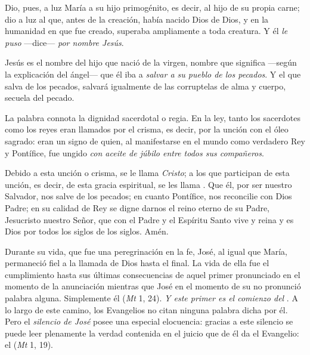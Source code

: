 \begin{body}
				Dio, pues, a luz María a su hijo primogénito, es decir, al hijo de su propia carne; dio a luz al que, antes de la creación, había nacido Dios de Dios, y en la humanidad en que fue creado, superaba ampliamente a toda creatura. Y él \emph{le puso} ---dice--- \emph{por nombre Jesús}.
				
				Jesús es el nombre del hijo que nació de la virgen, nombre que significa ---según la explicación del ángel--- que él iba a \emph{salvar a su pueblo de los pecados}. Y el que salva de los pecados, salvará igualmente de las corruptelas de alma y cuerpo, secuela del pecado.
				
				La palabra  connota la dignidad sacerdotal o regia. En la ley, tanto los sacerdotes como los reyes eran llamados  por el crisma, es decir, por la unción con el óleo sagrado: eran un signo de quien, al manifestarse en el mundo como verdadero Rey y Pontífice, fue ungido \emph{con aceite de júbilo entre todos sus compañeros}.
				
				Debido a esta unción o crisma, se le llama \emph{Cristo}; a los que participan de esta unción, es decir, de esta gracia espiritual, se les llama . Que él, por ser nuestro Salvador, nos salve de los pecados; en cuanto Pontífice, nos reconcilie con Dios Padre; en su calidad de Rey se digne darnos el reino eterno de su Padre, Jesucristo nuestro Señor, que con el Padre y el Espíritu Santo vive y reina y es Dios por todos los siglos de los siglos. Amén.
			\end{body}
				
				
				
				Durante su vida, que fue una peregrinación en la fe, José, al igual que María, permaneció fiel a la llamada de Dios hasta el final. La vida de ella fue el cumplimiento hasta sus últimas consecuencias de aquel primer  pronunciado en el momento de la anunciación mientras que José en el momento de su  no pronunció palabra alguna. Simplemente él  (\emph{Mt} 1, 24). \emph{Y este primer  es el comienzo del }. A lo largo de este camino, los Evangelios no citan ninguna palabra dicha por él. Pero el \emph{silencio de José} posee una especial elocuencia: gracias a este silencio se puede leer plenamente la verdad contenida en el juicio que de él da el Evangelio: el  (\emph{Mt} 1, 19).
				

